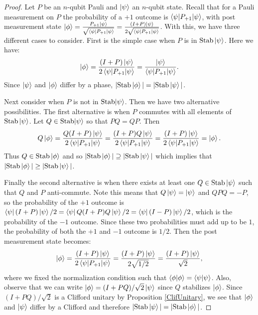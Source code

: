 \documentclass[12pt]{dalthesis}
\begin{document}

\begin{proof}
Let $P$ be an $n$-qubit Pauli and $\ket{\psi}$ an $n$-qubit state. Recall that for a Pauli measurement on $P$ the probability of a $+1$ outcome is $\braket{\psi | P_{+1} | \psi}$, with post measurement state $\ket{\phi} = \frac{P_{+1} \ket{\psi}}{\sqrt{\braket{\psi | P_{+1} | \psi}}} =  \frac{(I+P) \ket{\psi}}{2 \sqrt{\braket{\psi | P_{+1} | \psi}}}$. With this, we have three different cases to consider. First is the simple case when $P$ is in $\mathrm{Stab}\ket{\psi}$. Here we have: 
\begin{equation*}
\ket{\phi} = \frac{(I+P) \ket{\psi}}{2\braket{\psi | P_{+1} | \psi}} = \frac{\ket{\psi}}{\braket{\psi |P_{+1}| \psi}}.
\end{equation*}
Since $\ket{\psi}$ and $\ket{\phi}$ differ by a phase, $|\mathrm{Stab}\ket{\phi}| = |\mathrm{Stab}\ket{\psi}|$.

Next consider when $P$ is not in $\mathrm{Stab}{\ket{\psi}}$. Then we have two alternative possibilities. The first alternative is when $P$ commutes with all elements of $\mathrm{Stab}\ket{\psi}$. Let $Q \in \mathrm{Stab}{\ket{\psi}}$ so that $PQ = QP$. Then 
\begin{equation*}
Q\ket{\phi} = \frac{Q(I+P) \ket{\psi}}{2\braket{\psi | P_{+1} | \psi}} = \frac{(I+P)Q\ket{\psi}}{2\braket{\psi |P_{+1}| \psi}} = \frac{(I+P)\ket{\psi}}{2\braket{\psi |P_{+1}| \psi}} = \ket{\phi}.
\end{equation*}
Thus $Q \in \mathrm{Stab}\ket{\phi}$ and so $|\text{Stab}\ket{\phi}| \supseteq |\text{Stab}\ket{\psi}|$ which implies that $|\text{Stab}\ket{\phi}| \geq |\text{Stab}\ket{\psi}|$.

Finally the second alternative is when there exists at least one $Q \in \mathrm{Stab}\ket{\psi}$ such that $Q$ and $P$ anti-commute. Note this means that $Q\ket{\psi} = \ket{\psi}$ and $QPQ = -P$, so the probability of the $+1$ outcome is $\bra{\psi}(I+P)\ket{\psi}/2 = \bra{\psi}Q(I+P)Q\ket{\psi}/2 = \bra{\psi}(I-P)\ket{\psi}/2$, which is the probability of the $-1$ outcome. Since these two probabilities must add up to be $1$, the probability of both the $+1$ and $-1$ outcome is $1/2$. Then the post measurement state becomes:
\begin{equation*}
\ket{\phi} = \frac{(I+P) \ket{\psi}}{2\braket{\psi | P_{+1} | \psi}} = \frac{(I+P)\ket{\psi}}{2\sqrt{1/2}} = \frac{(I+P)\ket{\psi}}{\sqrt{2}},
\end{equation*}
where we fixed the normalization condition such that $\braket{\phi | \phi} = \braket{\psi | \psi}$. Also, observe that we can write $\ket{\phi} = (I+PQ)/\sqrt{2}\ket{\psi}$ since $Q$ stabilizes $\ket{\phi}$. Since $(I+PQ)/\sqrt{2}$ is a Clifford unitary by Proposition \ref{ClifUnitary}, we see that $\ket{\phi}$ and $\ket{\psi}$ differ by a Clifford and therefore $|\mathrm{Stab}\ket{\psi}| = |\mathrm{Stab}\ket{\phi}|$.
\end{proof}
\end{document}
